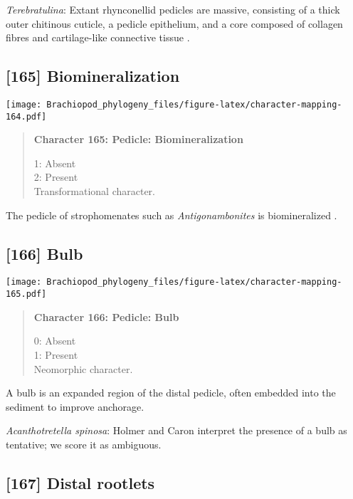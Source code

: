 \documentclass[openany]{book}
\theoremstyle{definition}
\theoremstyle{definition}
\theoremstyle{definition}
\theoremstyle{remark}
\begin{document}
\hypertarget{Terebratulina-coding-164}{}
\emph{Terebratulina}: Extant rhynconellid pedicles are massive,
consisting of a thick outer chitinous cuticle, a pedicle epithelium, and
a core composed of collagen fibres and cartilage-like connective tissue
\citep{Holmer2018Evolutionarysignificance}.

\subsection*{{[}165{]} Biomineralization}\label{biomineralization}

\texttt{[image: Brachiopod\_phylogeny\_files/figure-latex/character-mapping-164.pdf]}

\begin{quote}
\textbf{Character 165: Pedicle: Biomineralization}

1: Absent\\
2: Present\\
Transformational character.
\end{quote}

The pedicle of strophomenates such as \emph{Antigonambonites} is
biomineralized \citep{Holmer2018Evolutionarysignificance}.

\subsection*{{[}166{]} Bulb}\label{bulb}

\texttt{[image: Brachiopod\_phylogeny\_files/figure-latex/character-mapping-165.pdf]}

\begin{quote}
\textbf{Character 166: Pedicle: Bulb}

0: Absent\\
1: Present\\
Neomorphic character.
\end{quote}

A bulb is an expanded region of the distal pedicle, often embedded into
the sediment to improve anchorage.

\hypertarget{Acanthotretella_spinosa-coding-166}{}
\emph{Acanthotretella spinosa}: Holmer and Caron
\citeyearpar{Holmer2006Aspinose} interpret the presence of a bulb as
tentative; we score it as ambiguous.

\subsection*{{[}167{]} Distal rootlets}\label{distal-rootlets}
\end{document}
